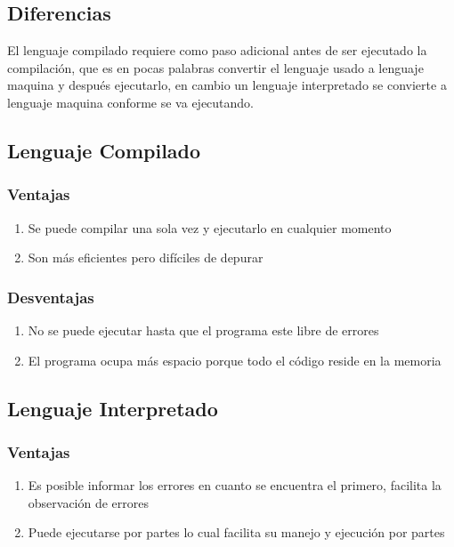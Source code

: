 \documentclass[12pt,oneside]{book}
\begin{document}
\subsection{Diferencias}
El lenguaje compilado requiere como paso adicional antes de ser ejecutado la compilación, que es en pocas palabras convertir el lenguaje usado a lenguaje maquina y después ejecutarlo, en cambio un lenguaje interpretado se convierte a lenguaje maquina conforme se va ejecutando.

\subsection{Lenguaje Compilado}
\subsubsection*{Ventajas}
\begin{enumerate}
    \item Se puede compilar una sola vez y ejecutarlo en cualquier momento
    \item Son más eficientes pero difíciles de depurar
\end{enumerate}
\subsubsection*{Desventajas}
\begin{enumerate}
    \item No se puede ejecutar hasta que el programa este libre de errores
    \item El programa ocupa más espacio porque todo el código reside en la memoria
\end{enumerate}

\subsection{Lenguaje Interpretado}
\subsubsection*{Ventajas}
\begin{enumerate}
    \item Es posible informar los errores en cuanto se encuentra el primero, facilita la observación de errores
    \item Puede ejecutarse por partes lo cual facilita su manejo y ejecución por partes
\end{enumerate}
\end{document}
